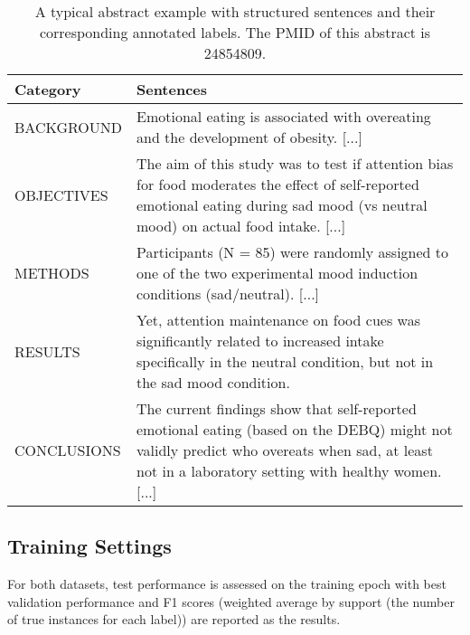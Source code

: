 \documentclass[11pt,a4paper]{article}
\begin{document}
\begin{table*}[h!]
\centering
\begin{tabular}{ |>{\raggedright\arraybackslash} m{2.7cm} |>{\raggedright\arraybackslash} m{12.3cm}|}
\hline
\textbf{Category} & \textbf{Sentences}                                                                                                                                                                                              \\ \hline
BACKGROUND                            & Emotional eating is associated with overeating and the development of obesity. {[}...{]}                                    \\ \hline
OBJECTIVES                         & The aim of this study was to test if attention bias for food moderates the effect of self-reported emotional eating during sad mood (vs neutral mood) on actual food intake. [...]                                        \\ \hline
METHODS                        & Participants (N = 85) were randomly assigned to one of the two experimental mood induction conditions (sad/neutral). [...]            \\ \hline
RESULTS                   & [...] Yet, attention maintenance on food cues was significantly related to increased intake specifically in the neutral condition, but not in the sad mood condition.                                                                   \\ \hline
CONCLUSIONS               & The current findings show that self-reported emotional eating (based on the DEBQ) might not validly predict who overeats when sad, at least not in a laboratory setting with healthy women. [...]                                \\ \hline
\end{tabular}
\caption{A typical abstract example with structured sentences and their corresponding annotated labels. The PMID of this abstract is 24854809. }
\label{table:abstract-example}
\end{table*}

\subsection{Training Settings}

For both datasets, test performance is assessed on the training epoch with best validation performance and F1 scores (weighted average by support (the number of true instances for each label)) are reported as the results.
\end{document}
